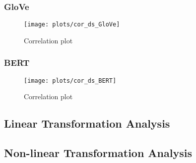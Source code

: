 \subsubsection{GloVe}
\begin{figure}[H]
  \texttt{[image: plots/cor\_ds\_GloVe]}
  \centering
  \caption{Correlation plot}
\end{figure}\label{fig:cor_ds_GloVe}

\subsubsection{BERT}
\begin{figure}[H]
  \texttt{[image: plots/cor\_ds\_BERT]}
  \centering
  \caption{Correlation plot}
\end{figure}\label{fig:cor_ds_BERT}


\subsection{Linear Transformation Analysis}\label{sub:Linear Transformation Analysis}


\subsection{Non-linear Transformation Analysis}\label{sub:Non-linear Transformation Analysis}


